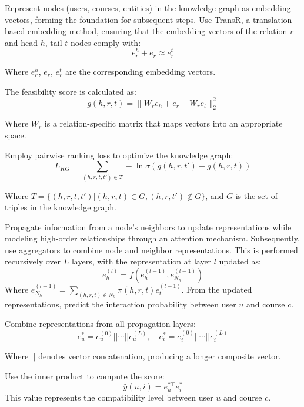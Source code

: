 \documentclass{ieeeaccess}
\begin{document}
Represent nodes (users, courses, entities) in the knowledge graph as embedding vectors, forming the foundation for subsequent steps. Use TransR, a translation-based embedding method, ensuring that the embedding vectors of the relation \( r \) and head \( h \), tail \( t \) nodes comply with:
\begin{equation}
    e_r^h + e_r \approx e_r^t
\end{equation}

Where \( e_r^h \), \( e_r \), \( e_r^t \) are the corresponding embedding vectors.

The feasibility score is calculated as:
\begin{equation}
    g(h, r, t) = \|W_r e_h + e_r - W_r e_t\|_2^2
\end{equation}

Where \( W_r \) is a relation-specific matrix that maps vectors into an appropriate space.

Employ pairwise ranking loss to optimize the knowledge graph:
\begin{equation}
    L_{KG} = \sum_{(h, r, t, t') \in T} -\ln \sigma(g(h, r, t') - g(h, r, t))
\end{equation}

Where \( T = \{(h, r, t, t') | (h, r, t) \in G, (h, r, t') \notin G\} \), and \( G \) is the set of triples in the knowledge graph.

Propagate information from a node’s neighbors to update representations while modeling high-order relationships through an attention mechanism. Subsequently, use aggregators to combine node and neighbor representations. This is performed recursively over \( L \) layers, with the representation at layer \( l \) updated as:
\begin{equation}
    e_h^{(l)} = f(e_h^{(l-1)}, e_{N_h}^{(l-1)})
\end{equation}
Where \( e_{N_h}^{(l-1)} = \sum_{(h, r, t) \in N_h} \pi(h, r, t) e_t^{(l-1)} \).
From the updated representations, predict the interaction probability between user \( u \) and course \( c \).

Combine representations from all propagation layers:
\begin{equation}
    e_u^* = e_u^{(0)} || \cdots || e_u^{(L)}, \quad e_i^* = e_i^{(0)} || \cdots || e_i^{(L)}
\end{equation}

Where \( || \) denotes vector concatenation, producing a longer composite vector.

Use the inner product to compute the score:
\begin{equation}
    \hat{y}(u, i) = e_u^{*\top} e_i^*
\end{equation}
This value represents the compatibility level between user \( u \) and course \( c \).
\end{document}
